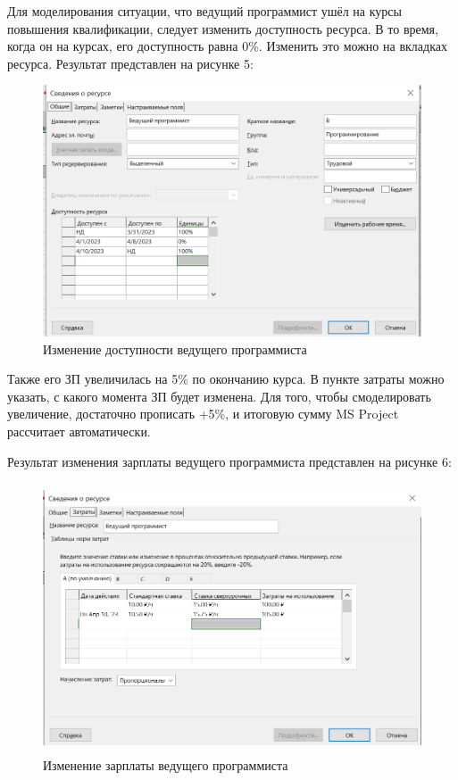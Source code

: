 \newpage
Для моделирования ситуации, что ведущий программист ушёл на курсы повышения квалификации, следует изменить доступность ресурса. 
В то время, когда он на курсах, его доступность равна 0\%. 
Изменить это можно на вкладках ресурса.
Результат представлен на рисунке 5:
\FloatBarrier
\begin{figure}[h]	
	\begin{center}
		\includegraphics[width=\linewidth]{inc/resurs1.png}
	\end{center}
	\captionsetup{justification=centering}
	\caption{Изменение доступности ведущего программиста}
\end{figure}
\FloatBarrier 

Также его ЗП увеличилась на 5\% по окончанию курса.
В пункте затраты можно указать, с какого момента ЗП будет изменена.
Для того, чтобы смоделировать увеличение, достаточно прописать +5\%, и итоговую сумму MS Project рассчитает автоматически.

\newpage
Результат изменения зарплаты ведущего программиста представлен на рисунке 6:
\FloatBarrier
\begin{figure}[h]	
	\begin{center}
		\includegraphics[height=8cm]{inc/resurs2.png}
	\end{center}
	\captionsetup{justification=centering}
	\caption{Изменение зарплаты ведущего программиста}
\end{figure}
\FloatBarrier 

